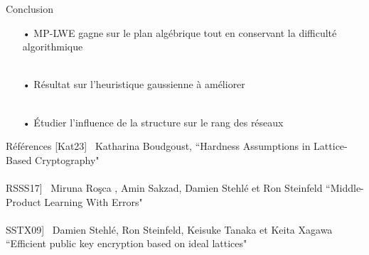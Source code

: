\documentclass[10 pt, a4paper]{beamer}
\begin{document}
\begin{frame}{Conclusion}
\begin{itemize}
\item[•] MP-LWE gagne sur le plan algébrique tout en conservant la difficulté algorithmique\\ ~ \\
\item[•] Résultat sur l'heuristique gaussienne à améliorer\\ ~ \\
\item[•] Étudier l'influence de la structure sur le rang des réseaux
\end{itemize}
\end{frame}


\begin{frame}{Références}
[Kat23] \ Katharina Boudgoust, ``Hardness Assumptions in Lattice-Based Cryptography" \\ ~ \\
RSSS17] \ Miruna Roşca , Amin Sakzad, Damien Stehlé et Ron Steinfeld ``Middle-Product Learning With Errors"\\ ~ \\
SSTX09] \ Damien Stehlé, Ron Steinfeld, Keisuke Tanaka et Keita Xagawa “Efficient public key encryption based on ideal lattices"
\end{frame}
\end{document}

